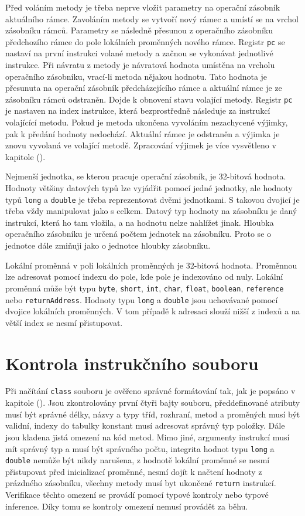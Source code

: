 Před voláním metody je třeba neprve vložit parametry na operační zásobník aktuálního rámce. Zavoláním metody se vytvoří nový rámec a umístí se na vrchol zásobníku rámců. Parametry se následně přesunou z operačního zásobníku předchozího rámce do pole lokálních proměnných nového rámce. Registr \texttt{pc} se nastaví na první instrukci volané metody a začnou se vykonávat jednotlivé instrukce. Při návratu z metody je návratová hodnota umístěna na vrcholu operačního zásobníku, vrací-li metoda nějakou hodnotu. Tato hodnota je přesunuta na operační zásobník předcházejícího rámce a aktuální rámec je ze zásobníku rámců odstraněn. Dojde k obnovení stavu volající metody. Registr \texttt{pc} je nastaven na index instrukce, která bezprostředně následuje za instrukcí volajícící metodu. Pokud je metoda ukončena vyvoláním nezachycené výjimky, pak k předání hodnoty nedochází. Aktuální rámec je odstraněn a výjimka je znovu vyvolaná ve volající metodě. Zpracování výjimek je více vysvětleno v kapitole ().

Nejmenší jednotka, se kterou pracuje operační zásobník, je 32-bitová hodnota. Hodnoty většiny datových typů lze vyjádřit pomocí jedné jednotky, ale hodnoty typů \texttt{long} a \texttt{double} je třeba reprezentovat dvěmi jednotkami. S takovou dvojicí je třeba vždy manipulovat jako s celkem. Datový typ hodnoty na zásobníku je daný instrukcí, která ho tam vložila, a na hodnotu nelze nahlížet jinak. Hloubka operačního zásobníku je určená počtem jednotek na zásobníku. Proto se o jednotce dále zmiňuji jako o jednotce hloubky zásobníku.

Lokální proměnná v poli lokálních proměnných je 32-bitová hodnota. Proměnnou lze adresovat pomocí indexu do pole, kde pole je indexováno od nuly. Lokální proměnná může být typu \texttt{byte}, \texttt{short}, \texttt{int}, \texttt{char}, \texttt{float}, \texttt{boolean}, \texttt{reference} nebo \texttt{returnAddress}. Hodnoty typu \texttt{long} a \texttt{double} jsou uchovávané pomocí dvojice lokálních proměnných. V tom případě k adresaci slouží nižší z indexů a na větší index se nesmí přistupovat. 

\section{Kontrola instrukčního souboru}

Při načítání \texttt{class} souboru je ověřeno správné formátování tak, jak je popsáno v kapitole (). Jsou zkontrolovány první čtyři bajty souboru, předdefinované atributy musí být správné délky, názvy a typy tříd, rozhraní, metod a proměných musí být validní, indexy do tabulky konstant musí adresovat správný typ položky. Dále jsou kladena jistá omezení na kód metod. Mimo jiné, argumenty instrukcí musí mít správný typ a musí být správného počtu, integrita hodnot typu \texttt{long} a \texttt{double} nemůže být nikdy narušena, z hodnotě lokální proměnné se nesmí přistupovat před inicializací proměnné, nesmí dojít k načtení hodnoty z prázdného zásobníku, všechny metody musí byt ukončené \texttt{return} instrukcí. Verifikace těchto omezení se provádí pomocí typové kontroly nebo typové inference. Díky tomu se kontroly omezení nemusí provádět za běhu.


